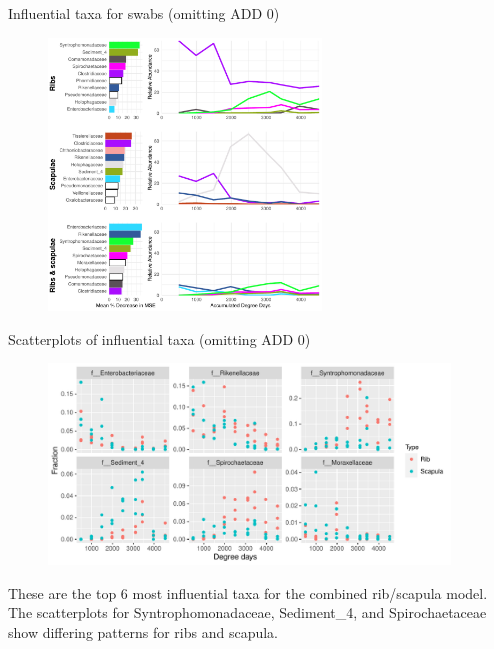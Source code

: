\documentclass{beamer}
\begin{document}
\begin{frame}{Influential taxa for swabs (omitting ADD 0)}

  \begin{center}
    \begin{figure}
      \includegraphics[height=2.85in]
        {w_swabs/bacteria/use_families/hl_combined_family_no_baseline_6panels}
    \end{figure}
  \end{center}

\end{frame}



\begin{frame}{Scatterplots of influential taxa (omitting ADD 0)}

  \begin{center}
    \begin{figure}
      \includegraphics[height=2.1in]
        {w_swabs/bacteria/use_families/both_ribs_scapulae/no_baseline/infl_combined_swab_no_baseline_family_scatter}
    \end{figure}
  \end{center}

  \vspace{0.15in}

  \footnotesize{ \noindent These are the top 6 most influential taxa for the
    combined rib/scapula model.  The scatterplots for Syntrophomonadaceae,
    Sediment\_4, and Spirochaetaceae show differing patterns for ribs and
    scapula.
    }

\end{frame}
\end{document}
